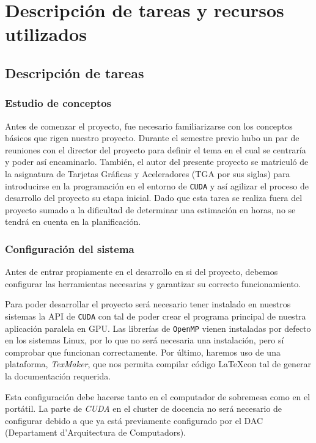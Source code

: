 \documentclass[titlepage,12pt]{report}
\begin{document}
\section{Descripción de tareas y recursos utilizados}

\subsection{Descripción de tareas}

\subsubsection{Estudio de conceptos}

Antes de comenzar el proyecto, fue necesario familiarizarse con los conceptos básicos que rigen nuestro proyecto. Durante el semestre previo hubo un par de reuniones con el director del proyecto para definir el tema en el cual se centraría y poder así encaminarlo. También, el autor del presente proyecto se matriculó de la asignatura de Tarjetas Gráficas y Aceleradores (TGA por sus siglas) para introducirse en la programación en el entorno de \texttt{CUDA} y así agilizar el proceso de desarrollo del proyecto su etapa inicial. Dado que esta tarea se realiza fuera del proyecto sumado a la dificultad de determinar una estimación en horas, no se tendrá en cuenta en la planificación.

\subsubsection{Configuración del sistema}

Antes de entrar propiamente en el desarrollo en si del proyecto, debemos configurar las herramientas necesarias y garantizar su correcto funcionamiento.

Para poder desarrollar el proyecto será necesario tener instalado en nuestros sistemas la API de \texttt{CUDA} con tal de poder crear el programa principal de nuestra aplicación paralela en GPU. Las librerías de \texttt{OpenMP} vienen instaladas por defecto en los sistemas Linux, por lo que no será necesaria una instalación, pero sí comprobar que funcionan correctamente. Por último, haremos uso de una plataforma, \textit{TexMaker}, que nos permita compilar código \LaTeX con tal de generar la documentación requerida.

Esta configuración debe hacerse tanto en el computador de sobremesa como en el portátil. La parte de \textit{CUDA} en el cluster de docencia no será necesario de configurar debido a que ya está previamente configurado por el DAC (Departament d'Arquitectura de Computadors). 
\end{document}
